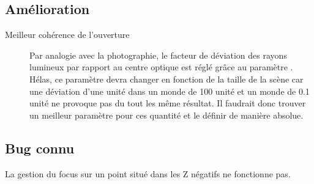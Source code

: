 \subsection{Amélioration}
\begin{description}
  \item [Meilleur cohérence de l'ouverture] Par analogie avec la photographie,
  le facteur de déviation des rayons lumineux par rapport au centre optique
  est réglé grâce au paramètre . Hélas, ce paramètre devra
  changer en fonction de la taille de la scène car une déviation d'une unité
  dans un monde de 100 unité et un monde de 0.1 unité ne provoque pas du tout
  les même résultat. Il faudrait donc trouver un meilleur paramètre pour ces
  quantité et le définir de manière absolue.
\end{description}

\subsection{Bug connu}
La gestion du focus sur un point situé dans les Z négatifs ne fonctionne pas.
